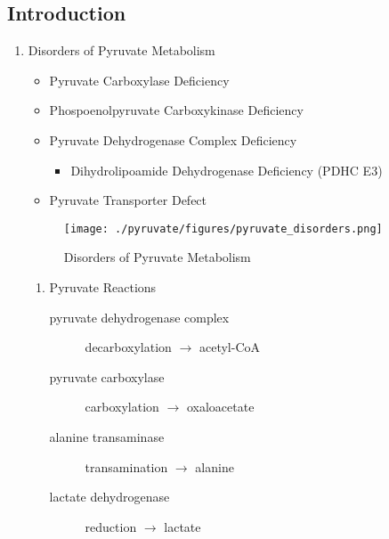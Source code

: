 \documentclass{scrartcl}
\begin{document}
\subsection{Introduction}
\label{sec:org73d54f7}
\begin{enumerate}
\item Disorders of Pyruvate Metabolism
\label{sec:orgddbd942}

\begin{itemize}
\item Pyruvate Carboxylase Deficiency
\item Phospoenolpyruvate Carboxykinase Deficiency
\item Pyruvate Dehydrogenase Complex Deficiency
\begin{itemize}
\item Dihydrolipoamide Dehydrogenase Deficiency (PDHC E3)
\end{itemize}
\item Pyruvate Transporter Defect
\end{itemize}


\begin{figure}[htbp]
\centering
\texttt{[image: ./pyruvate/figures/pyruvate\_disorders.png]}
\caption[TCA]{\label{fig:org1281339}
Disorders of Pyruvate Metabolism}
\end{figure}

\begin{enumerate}
\item Pyruvate Reactions
\label{sec:org27f3e3a}

\begin{description}
\item[{pyruvate dehydrogenase complex}] decarboxylation \(\to\) acetyl-CoA
\end{description}


\begin{description}
\item[{pyruvate carboxylase}] carboxylation \(\to\) oxaloacetate
\end{description}


\begin{description}
\item[{alanine transaminase}] transamination \(\to\) alanine
\end{description}


\begin{description}
\item[{lactate dehydrogenase}] reduction \(\to\) lactate
\end{description}

\end{enumerate}
\end{enumerate}
\end{document}
